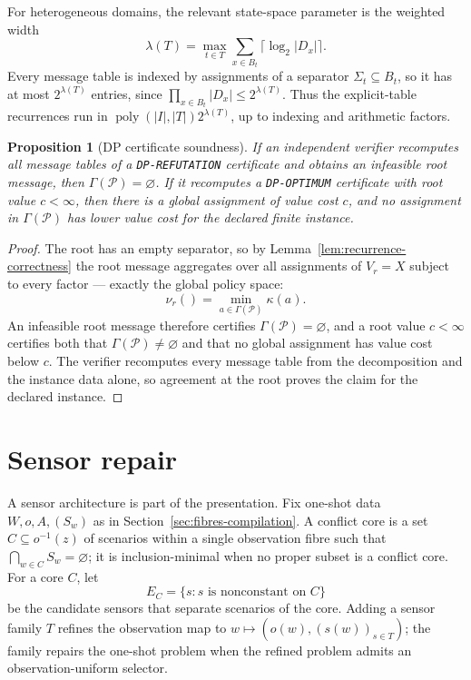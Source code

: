 \documentclass[11pt]{article}
\theoremstyle{plain}
\newtheorem{proposition}[theorem]{Proposition}
\theoremstyle{definition}
\theoremstyle{remark}
\begin{document}
For heterogeneous domains, the relevant state-space parameter is the weighted
width
\[
  \lambda(T)=\max_{t\in T}\sum_{x\in B_t}\lceil\log_2|D_x|\rceil.
\]
Every message table is indexed by assignments of a separator
\(\Sigma_t\subseteq B_t\), so it has at most \(2^{\lambda(T)}\) entries,
since \(\prod_{x\in B_t}|D_x|\le 2^{\lambda(T)}\).  Thus the
explicit-table recurrences run in
\(\operatorname{poly}(|I|,|T|)2^{\lambda(T)}\), up to indexing and
arithmetic factors.

\begin{proposition}[DP certificate soundness]
\label{prop:dp-soundness}
If an independent verifier recomputes all message tables of a
\texttt{DP-REFUTATION} certificate and obtains an infeasible root message,
then \(\Gamma(\mathcal P)=\varnothing\).  If it recomputes a \texttt{DP-OPTIMUM}
certificate with root value \(c<\infty\), then there is a global assignment
of value cost \(c\), and no assignment in \(\Gamma(\mathcal P)\) has lower value
cost for the declared finite instance.
\end{proposition}

\begin{proof}
The root has an empty separator, so by
Lemma~\ref{lem:recurrence-correctness} the root message aggregates over all
assignments of \(V_r=X\) subject to every factor --- exactly the global
policy space:
\[
  \nu_r()=\min_{a\in\Gamma(\mathcal P)}\kappa(a).
\]
An infeasible root message therefore certifies \(\Gamma(\mathcal
P)=\varnothing\), and a root value \(c<\infty\) certifies both that
\(\Gamma(\mathcal P)\ne\varnothing\) and that no global assignment has value
cost below \(c\).  The verifier recomputes every message table from the
decomposition and the instance data alone, so agreement at the root proves the
claim for the declared instance.
\end{proof}

\section{Sensor repair}
\label{sec:sensor-repair}

A sensor architecture is part of the presentation.  Fix one-shot data
\(W,o,A,(S_w)\) as in Section~\ref{sec:fibres-compilation}.  A conflict core
is a set \(C\subseteq o^{-1}(z)\) of scenarios within a single observation
fibre such that \(\bigcap_{w\in C}S_w=\varnothing\); it is inclusion-minimal
when no proper subset is a conflict core.  For a core \(C\), let
\[
  E_C=\{s:s\text{ is nonconstant on }C\}
\]
be the candidate sensors that separate scenarios of the core.  Adding a
sensor family \(T\) refines the observation map to
\(w\mapsto(o(w),(s(w))_{s\in T})\); the family repairs the one-shot problem
when the refined problem admits an observation-uniform selector.
\end{document}
